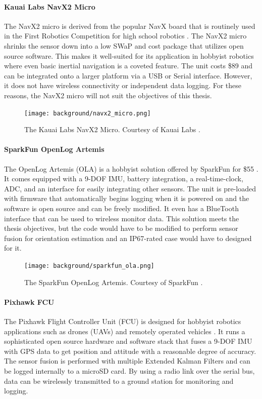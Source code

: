 \paragraph*{Kauai Labs NavX2 Micro} The NavX2 micro is derived from the popular NavX board that is routinely used in the First Robotics Competition for high school robotics \cite{KauaiLabs}.
The NavX2 micro shrinks the sensor down into a low SWaP and cost package that utilizes open source software.
This makes it well-suited for its application in hobbyist robotics where even basic inertial navigation is a coveted feature.
The unit costs \$89 and can be integrated onto a larger platform via a USB or Serial interface.
However, it does not have wireless connectivity or independent data logging.
For these reasons, the NavX2 micro will not suit the objectives of this thesis.

\begin{figure}
    \centering
    \caption[Kauai Labs NavX2 Micro]{The Kauai Labs NavX2 Micro.
    Courtesy of Kauai Labs \cite{KauaiLabs}.}
    \texttt{[image: background/navx2\_micro.png]}
\end{figure}

\paragraph*{SparkFun OpenLog Artemis} The OpenLog Artemis (OLA) is a hobbyist solution offered by SparkFun for \$55 \cite{SparkFun}.
It comes equipped with a 9-DOF IMU, battery integration, a real-time-clock, ADC, and an interface for easily integrating other sensors.
The unit is pre-loaded with firmware that automatically begins logging when it is powered on and the software is open source and can be freely modified.
It even has a BlueTooth interface that can be used to wireless monitor data.
This solution meets the thesis objectives, but the code would have to be modified to perform sensor fusion for orientation estimation and an IP67-rated case would have to designed for it.

\begin{figure}
    \centering
    \caption[SparkFun OpenLog Artemis]{The SparkFun OpenLog Artemis.
    Courtesy of SparkFun \cite{SparkFun}.}
    \texttt{[image: background/sparkfun\_ola.png]}
\end{figure}

\paragraph*{Pixhawk FCU} The Pixhawk Flight Controller Unit (FCU) is designed for hobbyist robotics applications such as drones (UAVs) and remotely operated vehicles \cite{HolyBro}.
It runs a sophisticated open source hardware and software stack that fuses a 9-DOF IMU with GPS data to get position and attitude with a reasonable degree of accuracy.
The sensor fusion is performed with multiple Extended Kalman Filters and can be logged internally to a microSD card.
By using a radio link over the serial bus, data can be wirelessly transmitted to a ground station for monitoring and logging.

